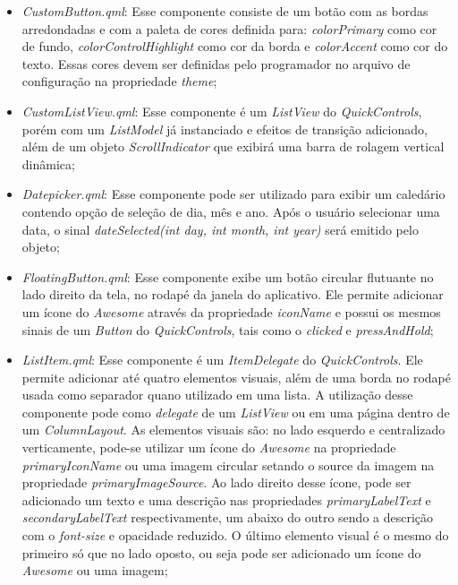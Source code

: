 \begin{itemize}
	\item \textit{CustomButton.qml}: Esse componente consiste de um botão com as bordas arredondadas e com a paleta de cores definida para: \textit{colorPrimary} como cor de fundo, \textit{colorControlHighlight} como cor da borda e \textit{colorAccent} como cor do texto. Essas cores devem ser definidas pelo programador no arquivo de configuração na propriedade \textit{theme};

	\item \textit{CustomListView.qml}: Esse componente é um \textit{ListView} do \textit{QuickControls}, porém com um \textit{ListModel} já instanciado e efeitos de transição adicionado, além de um objeto \textit{ScrollIndicator} que exibirá uma barra de rolagem vertical dinâmica;

	\item \textit{Datepicker.qml}: Esse componente pode ser utilizado para exibir um caledário contendo opção de seleção de dia, mês e ano. Após o usuário selecionar uma data, o sinal \textit{dateSelected(int day, int month, int year)} será emitido pelo objeto;

	\item \textit{FloatingButton.qml}: Esse componente exibe um botão circular flutuante no lado direito da tela, no rodapé da janela do aplicativo. Ele permite adicionar um ícone do \textit{Awesome} através da propriedade \textit{iconName} e possui os mesmos sinais de um \textit{Button} do \textit{QuickControls}, tais como o \textit{clicked} e \textit{pressAndHold};

	\item \textit{ListItem.qml}: Esse componente é um \textit{ItemDelegate} do \textit{QuickControls}. Ele permite adicionar até quatro elementos visuais, além de uma borda no rodapé usada como separador quano utilizado em uma lista. A utilização desse componente pode como \textit{delegate} de um \textit{ListView} ou em uma página dentro de um \textit{ColumnLayout}. As elementos visuais são: no lado esquerdo e centralizado verticamente, pode-se utilizar um ícone do \textit{Awesome} na propriedade \textit{primaryIconName} ou uma imagem circular setando o source da imagem na propriedade \textit{primaryImageSource}. Ao lado direito desse ícone, pode ser adicionado um texto e uma descrição nas propriedades \textit{primaryLabelText} e \textit{secondaryLabelText} respectivamente, um abaixo do outro sendo a descrição com o \textit{font-size} e opacidade reduzido. O último elemento visual é o mesmo do primeiro só que no lado oposto, ou seja pode ser adicionado um ícone do \textit{Awesome} ou uma imagem;


\end{itemize}
